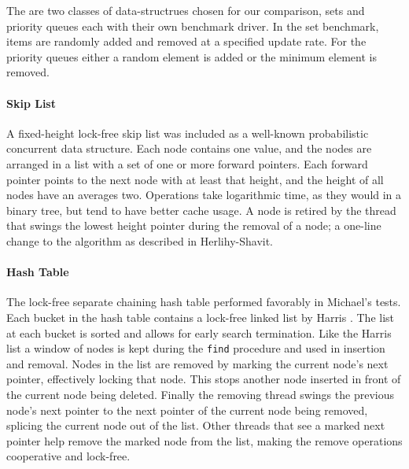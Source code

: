 
The are two classes of data-structrues chosen for our comparison, sets and priority queues each with their own benchmark driver. In the set benchmark, items are randomly added and removed at a specified update rate. For the priority queues either a random element is added or the minimum element is removed.

\paragraph{Skip List} A fixed-height lock-free skip list was included as a well-known probabilistic concurrent data structure.  Each node contains one value, and the nodes are arranged in a list with a set of one or more forward pointers.  Each forward pointer points to the next node with at least that height, and the height of all nodes have an averages two.  Operations take logarithmic time, as they would in a binary tree, but tend to have better cache usage. A node is retired by the thread that swings the lowest height pointer during the removal of a node; a one-line change to the algorithm as described in Herlihy-Shavit.\cite{HSBook}

\paragraph{Hash Table} The lock-free separate chaining hash table performed favorably in Michael's tests. \cite{HashTables} Each bucket in the hash table contains a lock-free linked list by Harris \cite{Harris}. The list at each bucket is sorted and allows for early search termination. Like the Harris list a window of nodes is kept during the \texttt{find} procedure and used in insertion and removal. Nodes in the list are removed by marking the current node's next pointer, effectively locking that node. This stops another node inserted in front of the current node being deleted. Finally the removing thread swings the previous node's next pointer to the next pointer of the current node being removed, splicing the current node out of the list. Other threads that see a marked next pointer help remove the marked node from the list, making the remove operations cooperative and lock-free.


